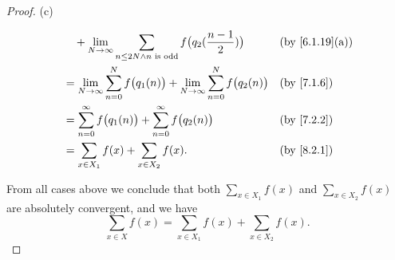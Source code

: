 \begin{proof}{(c)}
\begin{itemize}
\begin{align*}
			       & \quad + \lim_{N \to \infty} \sum_{n \leq 2N \land n \text{ is odd}} f\big(q_2(\dfrac{n - 1}{2})\big)          &  & \text{(by \cref{6.1.19}(a))} \\
			       & = \lim_{N \to \infty} \sum_{n = 0}^N f\big(q_1(n)\big) + \lim_{N \to \infty} \sum_{n = 0}^N f\big(q_2(n)\big) &  & \by{7.1.6}                   \\
			       & = \sum_{n = 0}^\infty f\big(q_1(n)\big) + \sum_{n = 0}^\infty f\big(q_2(n)\big)                               &  & \by{7.2.2}                   \\
			       & = \sum_{x \in X_1} f(x) + \sum_{x \in X_2} f(x).                                                              &  & \by{8.2.1}
		      \end{align*}
	\end{itemize}
	From all cases above we conclude that both \(\sum_{x \in X_1} f(x)\) and \(\sum_{x \in X_2} f(x)\) are absolutely convergent, and we have
	\[
		\sum_{x \in X} f(x) = \sum_{x \in X_1} f(x) + \sum_{x \in X_2} f(x).
	\]


\end{proof}
